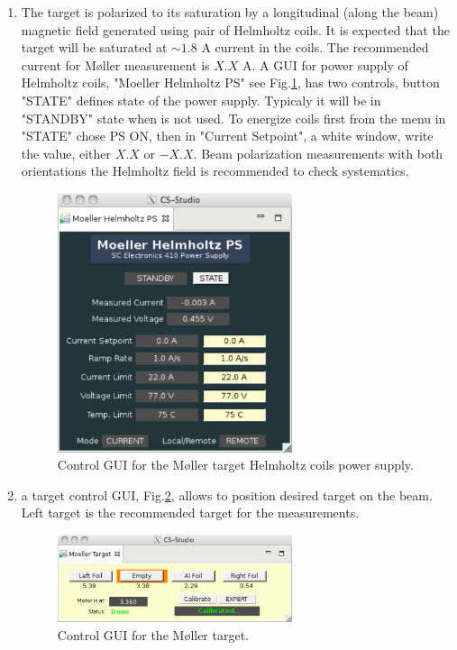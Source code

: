 \begin{enumerate}
\begin{enumerate}
\item The target is polarized to its saturation by a longitudinal (along the beam) magnetic field generated using pair of Helmholtz coils. It is expected that the target will be saturated at $\sim 1.8$ A current in the coils. The recommended current for M{\o}ller measurement is $X.X$ A. A GUI for power supply of Helmholtz coils, "Moeller Helmholtz PS" see Fig.\ref{fig:moller_helm}, has two controls, button "STATE" defines state of the power supply. Typicaly it will be in "STANDBY" state when is not used. To energize coils first from the menu in "STATE" chose PS ON, then in "Current Setpoint", a white window, write the value, either $X.X$ or $-X.X$. Beam polarization measurements with both orientations the Helmholtz field is recommended to check systematics.    

\begin{figure}
\begin{center}
\includegraphics[width=0.65\textwidth]{pics/moller_helmholtz.pdf}
\caption{Control GUI for the M{\o}ller target Helmholtz coils power supply.}
\label{fig:moller_helm}
\end{center}
\end{figure}

\item a target control GUI, Fig.\ref{fig:moller_target}, allows to position desired target on the beam. Left target is the recommended target for the measurements.

\begin{figure}
\begin{center}
\includegraphics[width=0.65\textwidth]{pics/moller_target.pdf}
\caption{Control GUI for the M{\o}ller target.}
\label{fig:moller_target}
\end{center}
\end{figure}


\end{enumerate}
\end{enumerate}
